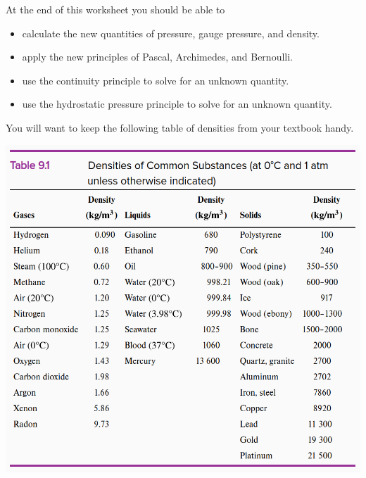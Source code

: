 At the end of this worksheet you should be able to  
\begin{itemize}
	\item calculate the new quantities of pressure, gauge pressure, and density.
	\item apply the new principles of Pascal, Archimedes, and Bernoulli.  
	\item use the continuity principle to solve for an unknown quantity.
	\item use the hydrostatic pressure principle to solve for an unknown quantity.
\end{itemize}

You will want to keep the following table of densities from your textbook handy.

\centering
\includegraphics[scale=.35]{week11-figures-density.png}

